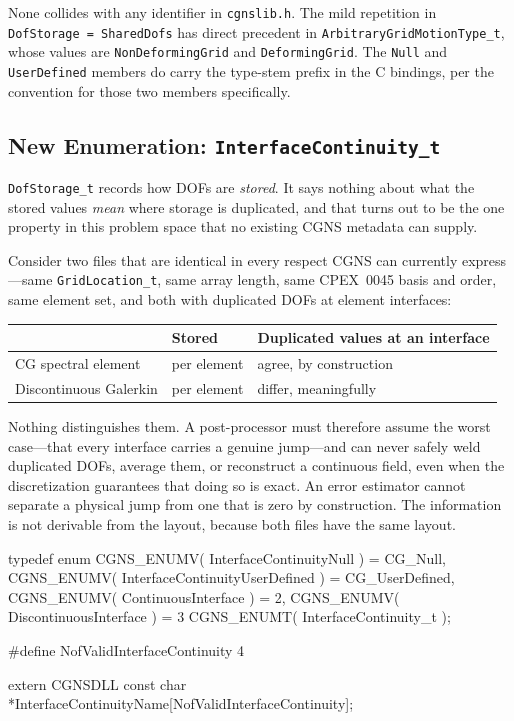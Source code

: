 \documentclass[11pt,letterpaper]{article}
\makeatletter
\let\cgns@orig@lstlisting\lstlisting
\let\cgns@endorig@lstlisting\endlstlisting
\renewenvironment{lstlisting}
  {\par\needspace{5\baselineskip}\nolinenumbers\cgns@orig@lstlisting}
  {\cgns@endorig@lstlisting\par\linenumbers}
\makeatother
\begin{document}
\noindent None collides with any identifier in \texttt{cgnslib.h}.  The
mild repetition in \texttt{DofStorage = SharedDofs} has direct precedent
in \texttt{ArbitraryGridMotionType\_t}, whose values are
\texttt{NonDeformingGrid} and \texttt{DeformingGrid}.  The
\texttt{Null} and \texttt{UserDefined} members do carry the type-stem
prefix in the C bindings, per the convention for those two members
specifically.

\subsection{New Enumeration: \texttt{InterfaceContinuity\_t}}
\label{sec:continuity}

\texttt{DofStorage\_t} records how DOFs are \emph{stored}.  It says
nothing about what the stored values \emph{mean} where storage is
duplicated, and that turns out to be the one property in this problem
space that no existing CGNS metadata can supply.

Consider two files that are identical in every respect CGNS can
currently express---same \texttt{GridLocation\_t}, same array length,
same CPEX~0045 basis and order, same element set, and both with
duplicated DOFs at element interfaces:

\begin{center}
\begin{tabular}{lll}
\toprule
& \textbf{Stored} & \textbf{Duplicated values at an interface} \\
\midrule
CG spectral element & per element & agree, by construction \\
Discontinuous Galerkin & per element & differ, meaningfully \\
\bottomrule
\end{tabular}
\end{center}

\noindent Nothing distinguishes them.  A post-processor must therefore
assume the worst case---that every interface carries a genuine
jump---and can never safely weld duplicated DOFs, average them, or
reconstruct a continuous field, even when the discretization guarantees
that doing so is exact.  An error estimator cannot separate a physical
jump from one that is zero by construction.  The information is not
derivable from the layout, because both files have the same layout.

\begin{lstlisting}[language=C]
typedef enum {
  CGNS_ENUMV( InterfaceContinuityNull )        = CG_Null,
  CGNS_ENUMV( InterfaceContinuityUserDefined ) = CG_UserDefined,
  CGNS_ENUMV( ContinuousInterface )            = 2,
  CGNS_ENUMV( DiscontinuousInterface )         = 3
} CGNS_ENUMT( InterfaceContinuity_t );

#define NofValidInterfaceContinuity 4

extern CGNSDLL const char
    *InterfaceContinuityName[NofValidInterfaceContinuity];
\end{lstlisting}
\end{document}

